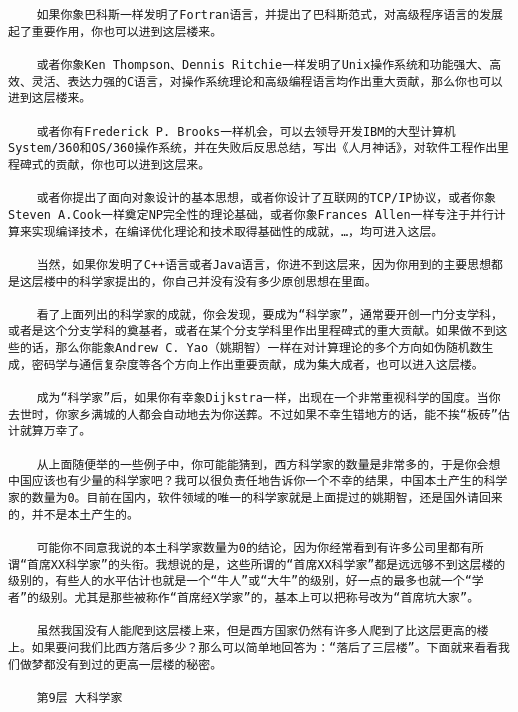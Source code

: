 \begin{verbatim}
    如果你象巴科斯一样发明了Fortran语言，并提出了巴科斯范式，对高级程序语言的发展起了重要作用，你也可以进到这层楼来。

    或者你象Ken Thompson、Dennis Ritchie一样发明了Unix操作系统和功能强大、高效、灵活、表达力强的C语言，对操作系统理论和高级编程语言均作出重大贡献，那么你也可以进到这层楼来。

    或者你有Frederick P. Brooks一样机会，可以去领导开发IBM的大型计算机System/360和OS/360操作系统，并在失败后反思总结，写出《人月神话》，对软件工程作出里程碑式的贡献，你也可以进到这层来。

    或者你提出了面向对象设计的基本思想，或者你设计了互联网的TCP/IP协议，或者你象Steven A.Cook一样奠定NP完全性的理论基础，或者你象Frances Allen一样专注于并行计算来实现编译技术，在编译优化理论和技术取得基础性的成就，…，均可进入这层。

    当然，如果你发明了C++语言或者Java语言，你进不到这层来，因为你用到的主要思想都是这层楼中的科学家提出的，你自己并没有没有多少原创思想在里面。

    看了上面列出的科学家的成就，你会发现，要成为“科学家”，通常要开创一门分支学科，或者是这个分支学科的奠基者，或者在某个分支学科里作出里程碑式的重大贡献。如果做不到这些的话，那么你能象Andrew C. Yao（姚期智）一样在对计算理论的多个方向如伪随机数生成，密码学与通信复杂度等各个方向上作出重要贡献，成为集大成者，也可以进入这层楼。

    成为“科学家”后，如果你有幸象Dijkstra一样，出现在一个非常重视科学的国度。当你去世时，你家乡满城的人都会自动地去为你送葬。不过如果不幸生错地方的话，能不挨“板砖”估计就算万幸了。

    从上面随便举的一些例子中，你可能能猜到，西方科学家的数量是非常多的，于是你会想中国应该也有少量的科学家吧？我可以很负责任地告诉你一个不幸的结果，中国本土产生的科学家的数量为0。目前在国内，软件领域的唯一的科学家就是上面提过的姚期智，还是国外请回来的，并不是本土产生的。

    可能你不同意我说的本土科学家数量为0的结论，因为你经常看到有许多公司里都有所谓“首席XX科学家”的头衔。我想说的是，这些所谓的“首席XX科学家”都是远远够不到这层楼的级别的，有些人的水平估计也就是一个“牛人”或“大牛”的级别，好一点的最多也就一个“学者”的级别。尤其是那些被称作“首席经X学家”的，基本上可以把称号改为“首席坑大家”。

    虽然我国没有人能爬到这层楼上来，但是西方国家仍然有许多人爬到了比这层更高的楼上。如果要问我们比西方落后多少？那么可以简单地回答为：“落后了三层楼”。下面就来看看我们做梦都没有到过的更高一层楼的秘密。

    第9层 大科学家


\end{verbatim}
